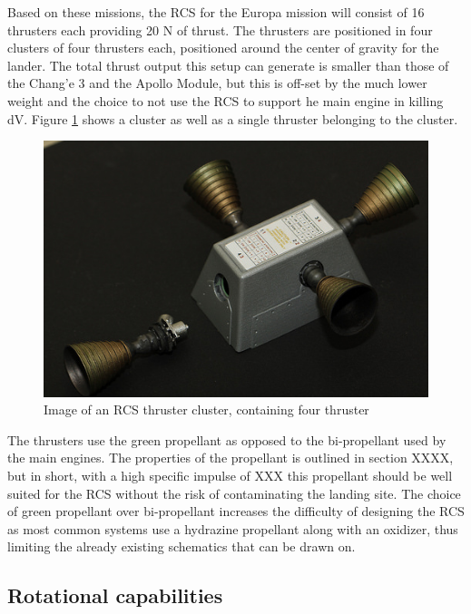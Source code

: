 Based on these missions, the RCS for the Europa mission will consist of 16 thrusters each providing 20 N of thrust. The thrusters are positioned in four clusters of four thrusters each, positioned around the center of gravity for the lander. The total thrust output this setup can generate is smaller than those of the Chang'e 3 and the Apollo Module, but this is off-set  by the much lower weight and the choice to not use the RCS to support he main engine in killing dV. Figure \ref{fig:RCS_thruster} shows a cluster as well as a single thruster belonging to the cluster.

\begin{figure}[htb]
\begin{center}
\includegraphics[scale=0.6]{figures/RCS/RCS_thruster2}
\caption{Image of an RCS thruster cluster, containing four thruster}
\label{fig:RCS_thruster}
\end{center}
\end{figure}


The thrusters use the green propellant as opposed to the bi-propellant used by the main engines. The properties of the propellant is outlined in section XXXX, but in short, with a high specific impulse of XXX this propellant should be well suited for the RCS without the risk of contaminating the landing site. The choice of green propellant over bi-propellant increases the difficulty of designing the RCS as most common systems use a hydrazine propellant along with an oxidizer, thus limiting the already existing schematics that can be drawn on.\\

\subsection{Rotational capabilities}

